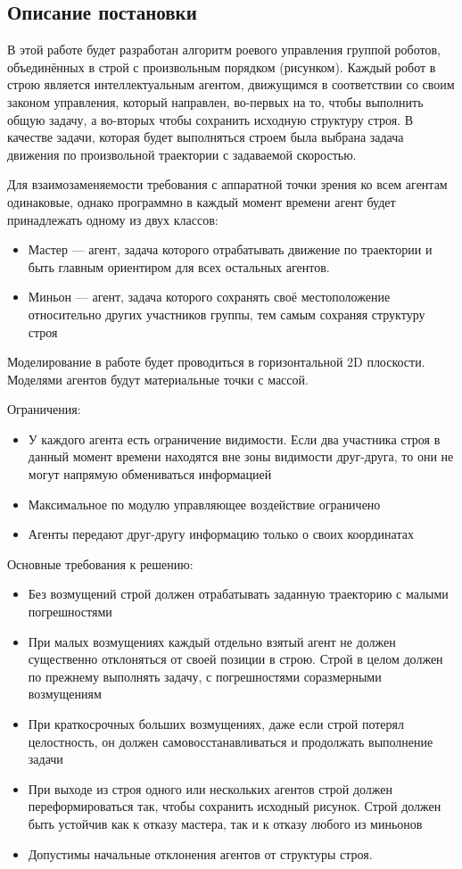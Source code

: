\documentclass[a4paper, 14pt]{extarticle}
\let\Oldsubsection\subsection
\renewcommand{\subsection}{\FloatBarrier\Oldsubsection}
\begin{document}
\subsection{Описание постановки}
В этой работе будет разработан алгоритм роевого управления группой роботов, объединённых в строй с произвольным порядком (рисунком). Каждый робот в строю является интеллектуальным агентом, движущимся в соответствии со своим законом управления, который направлен, во-первых на то, чтобы выполнить общую задачу, а во-вторых чтобы сохранить исходную структуру строя. В качестве задачи, которая будет выполняться строем была выбрана задача движения по произвольной траектории с задаваемой скоростью. \par
Для взаимозаменяемости требования с аппаратной точки зрения ко всем агентам одинаковые, однако программно в каждый момент времени агент будет принадлежать одному из двух классов:
\begin{itemize}
	\item Мастер — агент, задача которого отрабатывать движение по траектории и быть главным ориентиром для всех остальных агентов.
	\item Миньон — агент, задача которого сохранять своё местоположение относительно других участников группы, тем самым сохраняя структуру строя
\end{itemize}
\par
Моделирование в работе будет проводиться в горизонтальной 2D плоскости. Моделями агентов будут материальные точки с массой.
\par
Ограничения:
\begin{itemize}
	\item У каждого агента есть ограничение видимости. Если два участника строя в данный момент времени находятся вне зоны видимости друг-друга, то они не могут напрямую обмениваться информацией
	\item Максимальное по модулю управляющее воздействие ограничено
	\item Агенты передают друг-другу информацию только о своих координатах
\end{itemize}
Основные требования к решению:
\begin{itemize}
	\item Без возмущений строй должен отрабатывать заданную траекторию с малыми погрешностями
	\item При малых возмущениях каждый отдельно взятый агент не должен существенно отклоняться от своей позиции в строю. Строй в целом должен по прежнему выполнять задачу, с погрешностями соразмерными возмущениям
	\item При краткосрочных больших возмущениях, даже если строй потерял целостность, он должен самовосстанавливаться и продолжать выполнение задачи
	\item При выходе из строя одного или нескольких агентов строй должен переформироваться так, чтобы сохранить исходный рисунок. Строй должен быть устойчив как к отказу мастера, так и к отказу любого из миньонов
	\item Допустимы начальные отклонения агентов от структуры строя.
\end{itemize}
\end{document}
